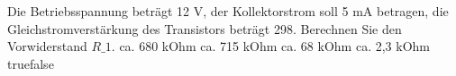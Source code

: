     {Die Betriebsspannung beträgt 12 V, der Kollektorstrom soll 5 mA betragen, die Gleichstromverstärkung des Transistors beträgt 298. Berechnen Sie den Vorwiderstand $R\_1$.}
    {ca. 680 kOhm}
    {ca. 715 kOhm}
    {ca. 68 kOhm}
    {ca. 2,3 kOhm}
    {true}{false}